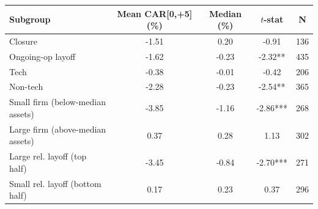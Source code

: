 \begin{tabular}{lcccc}
\toprule
Subgroup & Mean CAR[0,+5] (\%) & Median (\%) & $t$-stat & N \\
\midrule
Closure & -1.51 & 0.20 & -0.91 & 136 \\
Ongoing-op layoff & -1.62 & -0.23 & -2.32** & 435 \\
Tech & -0.38 & -0.01 & -0.42 & 206 \\
Non-tech & -2.28 & -0.23 & -2.54** & 365 \\
Small firm (below-median assets) & -3.85 & -1.16 & -2.86*** & 268 \\
Large firm (above-median assets) & 0.37 & 0.28 & 1.13 & 302 \\
Large rel. layoff (top half) & -3.45 & -0.84 & -2.70*** & 271 \\
Small rel. layoff (bottom half) & 0.17 & 0.23 & 0.37 & 296 \\
\bottomrule
\end{tabular}